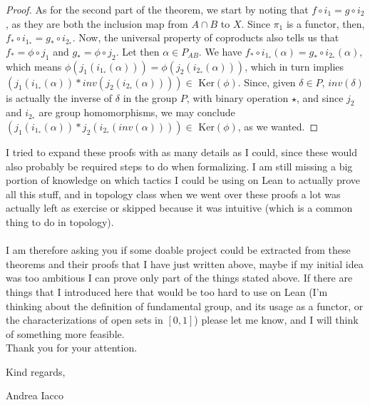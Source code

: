 \documentclass[12pt,a4paper]{article}
\begin{document}
\begin{proof}
As for the second part of the theorem, we start by noting that $f \circ i_1 = g \circ i_2$, as they are both the inclusion map from $A \cap B$ to $X$. Since $\pi_1$ is a functor, then, $f_\ast \circ i_{1_\ast} = g_\ast \circ i_{2_\ast}$. Now, the universal property of coproducts also tells us that $f_\ast = \phi \circ j_1$ and $g_\ast = \phi \circ j_2$. Let then $\alpha \in P_{AB}$. We have $f_\ast \circ i_{1_\ast} (\alpha) = g_\ast \circ i_{2_\ast} (\alpha)$, which means $\phi(j_1(i_{1_\ast} (\alpha))) = \phi(j_2(i_{2_\ast} (\alpha)))$, which in turn implies $(j_1(i_{1_\ast}(\alpha)) \ast inv(j_2(i_{2_\ast}(\alpha))))\in\text{ Ker}(\phi)$. Since, given $\delta\in P$, $inv(\delta)$ is actually the inverse of $\delta$ in the group $P$, with binary operation $\star$, and since $j_2$ and $i_{2_\ast}$ are group homomorphisms, we may conclude $(j_1(i_{1_\ast}(\alpha)) \ast j_2(i_{2_\ast}(inv(\alpha))))\in\text{ Ker}(\phi)$, as we wanted.
\end{proof}

I tried to expand these proofs with as many details as I could, since these would also probably be required steps to do when formalizing. I am still missing a big portion of knowledge on which tactics I could
be using on Lean to actually prove all this stuff, and in topology class when we went over these proofs a lot was actually left as exercise or skipped because it was intuitive (which is a common thing to do in topology).\\
\ \\
I am therefore asking you if some doable project could be extracted from these theorems and their proofs that I have just written above, maybe if my initial idea was too ambitious I can prove only part of the things stated
above. If there are things that I introduced here that would be too hard to use on Lean (I'm thinking about the definition of fundamental group, and its usage as a functor, or the characterizations of open sets in $[0,1]$)
please let me know, and I will think of something more feasible.\\

Thank you for your attention.

Kind regards,

Andrea Iacco
\end{document}
